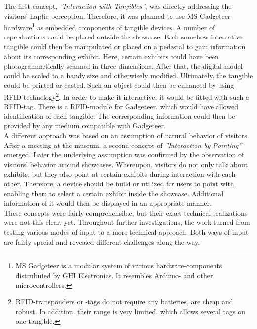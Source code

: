 The first concept, \textit{''Interaction with Tangibles''}, was directly addressing the visitors' haptic perception. Therefore, it was planned to use \ac{MS} Gadgeteer-hardware\footnote{\ac{MS} Gadgeteer is a modular system of various hardware-components distrubuted by GHI Electronics. It resembles Arduino- and other microcontrollers.} as embedded components of tangible devices. A number of reproductions could be placed outside the showcase. Each somehow interactive tangible could then be manipulated or placed on a pedestal to gain information about its corresponding exhibit. Here, certain exhibits could have been photogrammetically scanned in three dimensions. After that, the digital model could be scaled to a handy size and otherwisely modified. Ultimately, the tangible could be printed or casted. Such an object could then be enhanced by using \ac{RFID}-technology\footnote{RFID-transponders or -tags do not require any batteries, are cheap and robust. In addition, their range is very limited, which allows several tags on one tangible.}. In order to make it interactive, it would be fitted with such a \ac{RFID}-tag. There is a \ac{RFID}-module for Gadgeteer, which would have allowed identification of each tangible. The corresponding information could then be provided by any medium compatible with Gadgeteer.
\\
A different approach was based on an assumption of natural behavior of visitors. After a meeting at the museum, a second concept of \textit{''Interaction by Pointing''} emerged. Later the underlying assumption was confirmed by the observation of visitors' behavior around showcases. Whereupon, visitors do not only talk about exhibits, but they also point at certain exhibits during interaction with each other. Therefore, a device should be build or utilized for users to point with, enabling them to select a certain exhibit inside the showcase. Additional information of it would then be displayed in an appropriate manner. 
\\
These concepts were fairly comprehensible, but their exact technical realizations were not this clear, yet. Throughout further investigations, the work turned from testing various modes of input to a more technical approach. Both ways of input are fairly special and revealed different challenges along the way.


